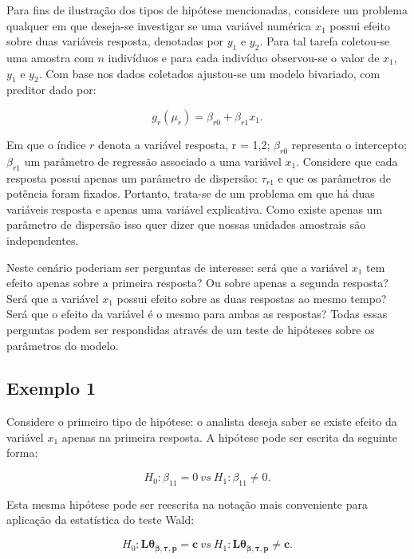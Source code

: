 Para fins de ilustração dos tipos de hipótese mencionadas, considere um problema qualquer em que deseja-se investigar se uma variável numérica $x_1$ possui efeito sobre duas variáveis resposta, denotadas por $y_1$ e $y_2$. Para tal tarefa coletou-se uma amostra com $n$ indivíduos e para cada indivíduo observou-se o valor de $x_1$, $y_1$ e $y_2$. Com base nos dados coletados ajustou-se um modelo bivariado, com preditor dado por:

\begin{equation}
g_r(\mu_r) = \beta_{r0} + \beta_{r1} x_1.
\end{equation}

\noindent Em que o índice $r$ denota a variável resposta, r = 1,2; $\beta_{r0}$ representa o intercepto; $\beta_{r1}$ um parâmetro de regressão associado a uma variável $x_1$. Considere que cada resposta possui apenas um parâmetro de dispersão: $\tau_{r1}$ e que os parâmetros de potência foram fixados. Portanto, trata-se de um problema em que há duas variáveis resposta e apenas uma variável explicativa. Como existe apenas um parâmetro de dispersão isso quer dizer que nossas unidades amostrais são independentes. 

Neste cenário poderiam ser perguntas de interesse: será que a variável $x_1$ tem efeito apenas sobre a primeira resposta? Ou sobre apenas a segunda resposta? Será que a variável $x_1$ possui efeito sobre as duas respostas ao mesmo tempo? Será que o efeito da variável é o mesmo para ambas as respostas? Todas essas perguntas podem ser respondidas através de um teste de hipóteses sobre os parâmetros do modelo.

\subsection{Exemplo 1}

Considere o primeiro tipo de hipótese: o analista deseja saber se existe efeito da variável $x_1$ apenas na primeira resposta. A hipótese pode ser escrita da seguinte forma:

\begin{equation}
H_0: \beta_{11} = 0 \ vs \ H_1: \beta_{11} \neq 0.
\end{equation}

Esta mesma hipótese pode ser reescrita na notação mais conveniente para aplicação da estatística do teste Wald:

\begin{equation}
H_0: \boldsymbol{L}\boldsymbol{\theta_{\beta,\tau,p}} = \boldsymbol{c} \ vs \ H_1: \boldsymbol{L}\boldsymbol{\theta_{\beta,\tau,p}} \neq \boldsymbol{c}.
\end{equation}

